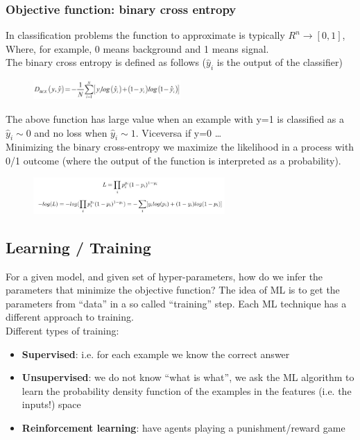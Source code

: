 \subsubsection{Objective function: binary cross entropy}
In classification problems the function to approximate is typically $R^n \rightarrow [0,1]$, Where, for example, 0 means background and 1 means signal.\\
The binary cross entropy is defined as follows ($\hat{y}_i$ is the output of the classifier)

\begin{figure}[h]
	\centering
	\includegraphics[width=0.5\textwidth]{figure_ml/D_bce.png}
\end{figure}
\FloatBarrier
The above function has large value when an example with y=1 is classified as 
a  $\hat{y}_i \sim 0$ and no loss when $\hat{y}_i \sim 1$. Viceversa if y=0 …\\
Minimizing the binary cross-entropy we maximize the likelihood in a process with 0/1 outcome (where the output of the function is interpreted as a probability).

\begin{figure}[h]
	\centering
	\includegraphics[width=0.65\textwidth]{figure_ml/L_bce.png}
\end{figure}
\FloatBarrier

\subsection{Learning / Training}
For a given model, and given set of hyper-parameters, how do we infer the parameters that minimize the objective function? The idea of ML is to get the parameters from “data” in a so called “training” step. Each ML technique has a different approach to training.\\
Different types of training:
\begin{itemize}
	\item \textbf{Supervised}: i.e. for each example we know the correct answer
	\item \textbf{Unsupervised}: we do not know “what is what”, we ask the ML algorithm to learn the probability density function of the examples in the features (i.e. the inputs!) space
	\item \textbf{Reinforcement learning}: have agents playing a punishment/reward game
\end{itemize}

